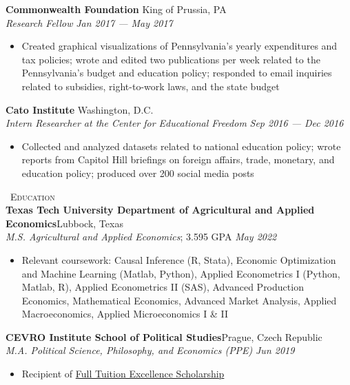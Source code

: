 \documentclass[a4paper,11pt]{article}
\newcommand{\header} [1] {
    \vspace*{2pt}
    {\textsc{\large{\xrfill[0.1ex]{0.5pt}~#1~\xrfill[0.1ex]{0.5pt}}}}
    \vspace*{2pt}
}
\begin{document}
\textbf{Commonwealth Foundation} \hfill King of Prussia, PA\\
\textit{Research Fellow} \hfill  \emph{Jan 2017 --- May 2017}\\
\begin{itemize}
    \item Created graphical visualizations of Pennsylvania's yearly expenditures and tax policies; wrote and edited two publications per week related to the Pennsylvania's budget and education policy; responded to email inquiries related to subsidies, right-to-work laws, and the state budget
\end{itemize}

\textbf{Cato Institute} \hfill Washington, D.C.\\
\textit{Intern Researcher at the Center for Educational Freedom} \hfill \emph{Sep 2016 --- Dec 2016}\\
\begin{itemize}
    \item Collected and analyzed datasets related to national education policy; wrote reports from Capitol Hill briefings on foreign affairs, trade, monetary, and education policy; produced over 200 social media posts 
\end{itemize}
\vspace{1mm}

\header{Education} \\
\textbf{Texas Tech University Department of Agricultural and Applied Economics}\hfill Lubbock, Texas\\
\textit{M.S. Agricultural and Applied Economics}; 3.595 GPA \hfill  \emph{May 2022} \\
\begin{itemize}
    \item Relevant coursework: Causal Inference (R, Stata), Economic Optimization and Machine Learning (Matlab, Python), Applied Econometrics I (Python, Matlab, R), Applied Econometrics II (SAS), Advanced Production Economics, Mathematical Economics, Advanced Market Analysis, Applied Macroeconomics, Applied Microeconomics I \& II
\end{itemize}

\textbf{CEVRO Institute School of Political Studies}\hfill Prague, Czech Republic\\
\textit{M.A. Political Science, Philosophy, and Economics (PPE)} \hfill  \emph{Jun 2019}\\
\begin{itemize}
    \item Recipient of \href{http://www.cevroinstitut.cz/en/article/scholarships/}{Full Tuition Excellence Scholarship}
\end{itemize}
\end{document}
